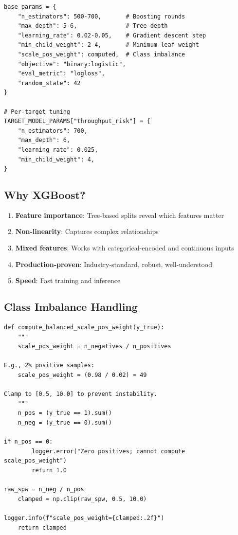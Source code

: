 \documentclass[11pt,a4paper,oneside]{report}
\begin{document}
\begin{lstlisting}
base_params = {
    "n_estimators": 500-700,       # Boosting rounds
    "max_depth": 5-6,              # Tree depth
    "learning_rate": 0.02-0.05,    # Gradient descent step
    "min_child_weight": 2-4,       # Minimum leaf weight
    "scale_pos_weight": computed,  # Class imbalance
    "objective": "binary:logistic",
    "eval_metric": "logloss",
    "random_state": 42
}

# Per-target tuning
TARGET_MODEL_PARAMS["throughput_risk"] = {
    "n_estimators": 700,
    "max_depth": 6,
    "learning_rate": 0.025,
    "min_child_weight": 4,
}
\end{lstlisting}

\subsection{Why XGBoost?}

\begin{enumerate}
    \item \textbf{Feature importance}: Tree-based splits reveal which features matter
    \item \textbf{Non-linearity}: Captures complex relationships
    \item \textbf{Mixed features}: Works with categorical-encoded and continuous inputs
    \item \textbf{Production-proven}: Industry-standard, robust, well-understood
    \item \textbf{Speed}: Fast training and inference
\end{enumerate}

\subsection{Class Imbalance Handling}

\begin{lstlisting}
def compute_balanced_scale_pos_weight(y_true):
    """
    scale_pos_weight = n_negatives / n_positives

E.g., 2% positive samples:
    scale_pos_weight = (0.98 / 0.02) ≈ 49

Clamp to [0.5, 10.0] to prevent instability.
    """
    n_pos = (y_true == 1).sum()
    n_neg = (y_true == 0).sum()

if n_pos == 0:
        logger.error("Zero positives; cannot compute scale_pos_weight")
        return 1.0

raw_spw = n_neg / n_pos
    clamped = np.clip(raw_spw, 0.5, 10.0)

logger.info(f"scale_pos_weight={clamped:.2f}")
    return clamped
\end{lstlisting}
\end{document}
